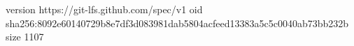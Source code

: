 version https://git-lfs.github.com/spec/v1
oid sha256:8092e60140729b8e7df3d083981dab5804acfeed13383a5c5c0040ab73bb232b
size 1107
